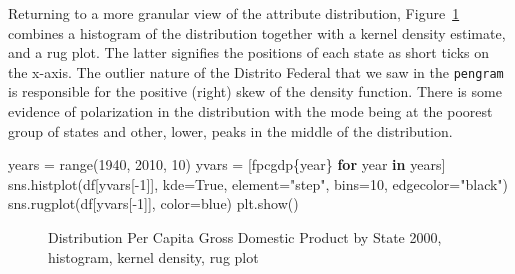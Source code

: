 \documentclass[
  a4paper, 
  twoside,
  final
]{article}
\newenvironment{Shaded}{\begin{snugshade}}{\end{snugshade}}
\newcommand{\BuiltInTok}[1]{\textcolor[rgb]{0.00,0.23,0.31}{#1}}
\newcommand{\ControlFlowTok}[1]{\textcolor[rgb]{0.00,0.23,0.31}{\textbf{#1}}}
\newcommand{\DecValTok}[1]{\textcolor[rgb]{0.68,0.00,0.00}{#1}}
\newcommand{\KeywordTok}[1]{\textcolor[rgb]{0.00,0.23,0.31}{\textbf{#1}}}
\newcommand{\NormalTok}[1]{\textcolor[rgb]{0.00,0.23,0.31}{#1}}
\newcommand{\OperatorTok}[1]{\textcolor[rgb]{0.37,0.37,0.37}{#1}}
\newcommand{\SpecialCharTok}[1]{\textcolor[rgb]{0.37,0.37,0.37}{#1}}
\newcommand{\SpecialStringTok}[1]{\textcolor[rgb]{0.13,0.47,0.30}{#1}}
\newcommand{\StringTok}[1]{\textcolor[rgb]{0.13,0.47,0.30}{#1}}
\newcommand{\VariableTok}[1]{\textcolor[rgb]{0.07,0.07,0.07}{#1}}
\begin{document}
Returning to a more granular view of the attribute distribution,
Figure~\ref{fig-kde2000} combines a histogram of the distribution
together with a kernel density estimate, and a rug plot. The latter
signifies the positions of each state as short ticks on the x-axis. The
outlier nature of the Distrito Federal that we saw in the
\texttt{pengram} is responsible for the positive (right) skew of the
density function. There is some evidence of polarization in the
distribution with the mode being at the poorest group of states and
other, lower, peaks in the middle of the distribution.

\begin{Shaded}
\begin{Highlighting}[]
\NormalTok{years }\OperatorTok{=} \BuiltInTok{range}\NormalTok{(}\DecValTok{1940}\NormalTok{, }\DecValTok{2010}\NormalTok{, }\DecValTok{10}\NormalTok{)}
\NormalTok{yvars }\OperatorTok{=}\NormalTok{ [}\SpecialStringTok{f\textquotesingle{}pcgdp}\SpecialCharTok{\{}\NormalTok{year}\SpecialCharTok{\}}\SpecialStringTok{\textquotesingle{}} \ControlFlowTok{for}\NormalTok{ year }\KeywordTok{in}\NormalTok{ years]}
\NormalTok{sns.histplot(df[yvars[}\OperatorTok{{-}}\DecValTok{1}\NormalTok{]], kde}\OperatorTok{=}\VariableTok{True}\NormalTok{, element}\OperatorTok{=}\StringTok{"step"}\NormalTok{,}
\NormalTok{             bins}\OperatorTok{=}\DecValTok{10}\NormalTok{, edgecolor}\OperatorTok{=}\StringTok{"black"}\NormalTok{)}
\NormalTok{sns.rugplot(df[yvars[}\OperatorTok{{-}}\DecValTok{1}\NormalTok{]], color}\OperatorTok{=}\StringTok{\textquotesingle{}blue\textquotesingle{}}\NormalTok{)}
\NormalTok{plt.show()}
\end{Highlighting}
\end{Shaded}

\begin{figure}[H]


\caption{\label{fig-kde2000}Distribution Per Capita Gross Domestic
Product by State 2000, histogram, kernel density, rug plot}

\end{figure}%
\end{document}
